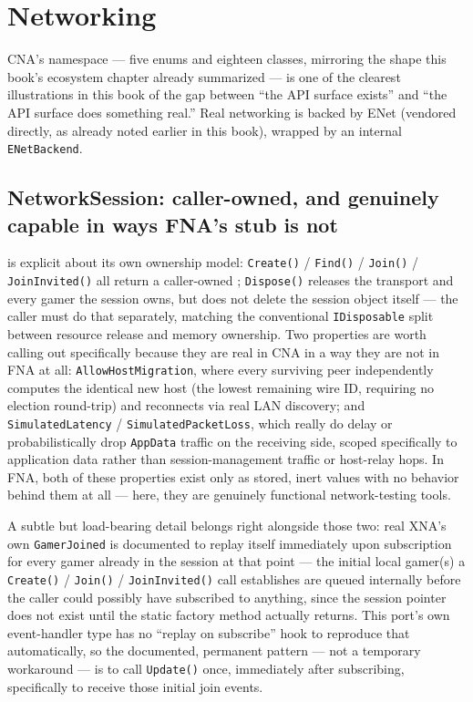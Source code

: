 \chapter{Networking}
\label{ch:networking}

CNA's  namespace --- five enums and eighteen classes,
mirroring the shape this book's ecosystem chapter already summarized --- is one of the
clearest illustrations in this book of the gap between ``the API surface exists'' and ``the
API surface does something real.'' Real networking is backed by ENet (vendored directly, as
already noted earlier in this book), wrapped by an internal \texttt{ENetBackend}.

\section{NetworkSession: caller-owned, and genuinely capable in ways FNA's stub is not}

 is explicit about its own ownership model: \texttt{Create()} /
\texttt{Find()} / \texttt{Join()} / \texttt{JoinInvited()} all return a caller-owned
; \texttt{Dispose()} releases the transport and every gamer the
session owns, but does not delete the session object itself --- the caller must do that
separately, matching the conventional \texttt{IDisposable} split between resource release and
memory ownership. Two properties are worth calling out specifically because they are real in
CNA in a way they are not in FNA at all: \texttt{AllowHostMigration}, where every surviving
peer independently computes the identical new host (the lowest remaining wire ID, requiring
no election round-trip) and reconnects via real LAN discovery; and
\texttt{SimulatedLatency} / \texttt{SimulatedPacketLoss}, which really do delay or
probabilistically drop \texttt{AppData} traffic on the receiving side, scoped specifically to
application data rather than session-management traffic or host-relay hops. In FNA, both of
these properties exist only as stored, inert values with no behavior behind them at all ---
here, they are genuinely functional network-testing tools.

A subtle but load-bearing detail belongs right alongside those two: real XNA's own
\texttt{GamerJoined} is documented to replay itself immediately upon subscription for every
gamer already in the session at that point --- the initial local gamer(s) a
\texttt{Create()} / \texttt{Join()} / \texttt{JoinInvited()} call establishes are queued
internally before the caller could possibly have subscribed to anything, since the session
pointer does not exist until the static factory method actually returns. This port's own
event-handler type has no ``replay on subscribe'' hook to reproduce that automatically, so the
documented, permanent pattern --- not a temporary workaround --- is to call \texttt{Update()}
once, immediately after subscribing, specifically to receive those initial join events.


